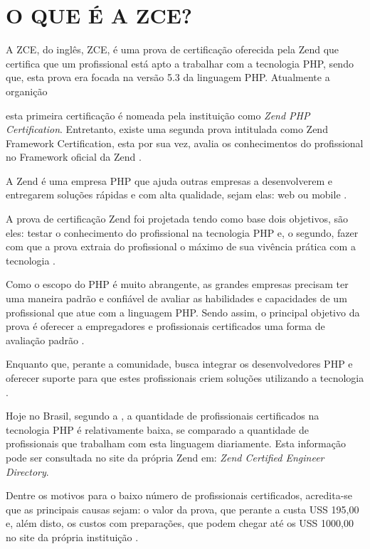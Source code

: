 \chapter{O QUE É A ZCE?}
\label{zce}

A \acs{ZCE}, do inglês, \acl{ZCE}, é uma prova de certificação oferecida
pela Zend que certifica que um profissional está apto a trabalhar com a
tecnologia \acs{PHP}, sendo que, esta prova era focada na versão 5.3 da
linguagem \acs{PHP}. Atualmente a organição 

esta primeira certificação é nomeada
pela instituição como \textit{Zend PHP Certification}. Entretanto, existe uma segunda prova intitulada como Zend Framework Certification, esta por sua vez, avalia os conhecimentos do profissional 
no Framework oficial da Zend \cite{websiteZendZce}. 

A Zend é uma empresa PHP que ajuda outras empresas a desenvolverem e entregarem
soluções rápidas e com alta qualidade, sejam elas: web ou mobile \cite{websiteZendCompany}.

A prova de certificação Zend foi projetada tendo como base dois objetivos, são
eles: testar o conhecimento do profissional na tecnologia PHP e, o segundo, fazer 
com que a prova extraia do profissional o máximo de sua vivência prática com a 
tecnologia \cite{theZendPHPCertificationPracticeTestBook}.

Como o escopo do PHP é muito abrangente, as grandes empresas precisam ter uma
maneira padrão e confiável de avaliar as habilidades e capacidades de um profissional 
que atue com a linguagem PHP. Sendo assim, o principal objetivo da prova é oferecer a 
empregadores e profissionais certificados uma forma de avaliação padrão
\cite{zendPhp5CertificationStudyGuide}.


Enquanto que, perante a comunidade, busca integrar os desenvolvedores PHP e
oferecer suporte para que estes profissionais criem soluções utilizando a tecnologia \cite{websiteZendCompany}.

Hoje no Brasil, segundo a , a quantidade de profissionais
certificados na tecnologia PHP é relativamente baixa, se comparado a quantidade 
de profissionais que trabalham com esta linguagem diariamente. Esta informação 
pode ser consultada no site da própria Zend em: \textit{Zend Certified Engineer
Directory}.

Dentre os motivos para o baixo número de profissionais certificados, acredita-se
que as principais causas sejam: o valor da prova, que perante a 
 custa USS 195,00 e, além disto, os custos com preparações, que podem chegar até
 os USS 1000,00 no site da própria instituição \cite{websiteZendOnlineTraining}.
